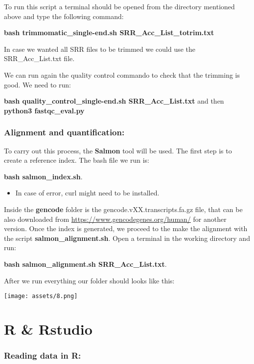 \documentclass[
]{article}
\providecommand{\tightlist}{%
  \setlength{\itemsep}{0pt}\setlength{\parskip}{0pt}}
\begin{document}
To run this script a terminal should be opened from the directory
mentioned above and type the following command:

\textbf{bash trimmomatic\_single-end.sh SRR\_Acc\_List\_totrim.txt}

In case we wanted all SRR files to be trimmed we could use the
SRR\_Acc\_List.txt file.

We can run again the quality control commando to check that the trimming
is good. We need to run:

\textbf{bash quality\_control\_single-end.sh SRR\_Acc\_List.txt} and
then \textbf{python3 fastqc\_eval.py}

\subsubsection{Alignment and
quantification:}\label{alignment-and-quantification}

To carry out this process, the \textbf{Salmon} tool will be used. The
first step is to create a reference index. The bash file we run is:

\textbf{bash salmon\_index.sh}.

\begin{itemize}
\tightlist
\item
  In case of error, curl might need to be installed.
\end{itemize}

Inside the \textbf{gencode} folder is the gencode.vXX.transcripts.fa.gz
file, that can be also downloaded from
\url{https://www.gencodegenes.org/human/} for another version. Once the
index is generated, we proceed to the make the alignment with the script
\textbf{salmon\_alignment.sh}. Open a terminal in the working directory
and run:

\textbf{bash salmon\_alignment.sh SRR\_Acc\_List.txt}.

After we run everything our folder should looks like this:

\texttt{[image: assets/8.png]}

\section{R \& Rstudio}\label{r-rstudio}

\subsubsection{Reading data in R:}\label{reading-data-in-r}
\end{document}
